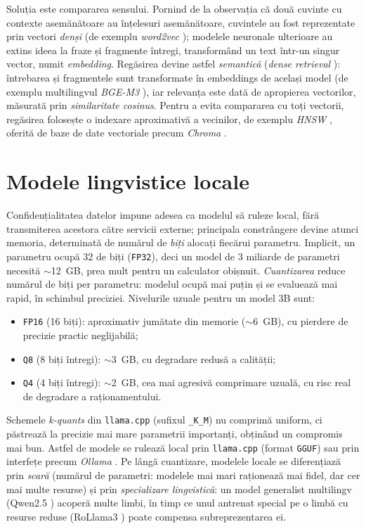 Soluția este compararea sensului. Pornind de la observația că două cuvinte cu contexte asemănătoare au înțelesuri asemănătoare, cuvintele au fost reprezentate prin vectori \emph{denși} (de exemplu \emph{word2vec} \cite{mikolov2013efficient}); modelele neuronale ulterioare au extins ideea la fraze și fragmente întregi, transformând un text într-un singur vector, numit \emph{embedding}. Regăsirea devine astfel \emph{semantică} (\emph{dense retrieval} \cite{karpukhin2020dense}): întrebarea și fragmentele sunt transformate în embeddings de același model (de exemplu multilingvul \emph{BGE-M3} \cite{chen2024bgem3}), iar relevanța este dată de apropierea vectorilor, măsurată prin \emph{similaritate cosinus}. Pentru a evita compararea cu toți vectorii, regăsirea folosește o indexare aproximativă a vecinilor, de exemplu \emph{HNSW} \cite{malkov2020hnsw}, oferită de baze de date vectoriale precum \emph{Chroma} \cite{chroma}.

\section{Modele lingvistice locale}
\label{sec:cuantizare}

Confidențialitatea datelor impune adesea ca modelul să ruleze local, fără transmiterea acestora către servicii externe; principala constrângere devine atunci memoria, determinată de numărul de \emph{biți} alocați fiecărui parametru. Implicit, un parametru ocupă 32 de biți (\texttt{FP32}), deci un model de 3 miliarde de parametri necesită $\sim$12~GB, prea mult pentru un calculator obișnuit. \emph{Cuantizarea} \cite{frantar2023gptq} reduce numărul de biți per parametru: modelul ocupă mai puțin și se evaluează mai rapid, în schimbul preciziei. Nivelurile uzuale pentru un model 3B sunt:

\begin{itemize}
    \item \texttt{FP16} (16 biți): aproximativ jumătate din memorie ($\sim$6~GB), cu pierdere de precizie practic neglijabilă;
    \item \texttt{Q8} (8 biți întregi): $\sim$3~GB, cu degradare redusă a calității;
    \item \texttt{Q4} (4 biți întregi): $\sim$2~GB, cea mai agresivă comprimare uzuală, cu risc real de degradare a raționamentului.
\end{itemize}

Schemele \emph{k-quants} din \texttt{llama.cpp} (sufixul \texttt{\_K\_M}) nu comprimă uniform, ci păstrează la precizie mai mare parametrii importanți, obținând un compromis mai bun. Astfel de modele se rulează local prin \texttt{llama.cpp} (format \texttt{GGUF}) sau prin interfețe precum \emph{Ollama} \cite{ollama}. Pe lângă cuantizare, modelele locale se diferențiază prin \emph{scară} (numărul de parametri: modelele mai mari raționează mai fidel, dar cer mai multe resurse) și prin \emph{specializare lingvistică}: un model generalist multilingv (Qwen2.5 \cite{yang2024qwen25}) acoperă multe limbi, în timp ce unul antrenat special pe o limbă cu resurse reduse (RoLlama3 \cite{masala2024openllmro}) poate compensa subreprezentarea ei.


